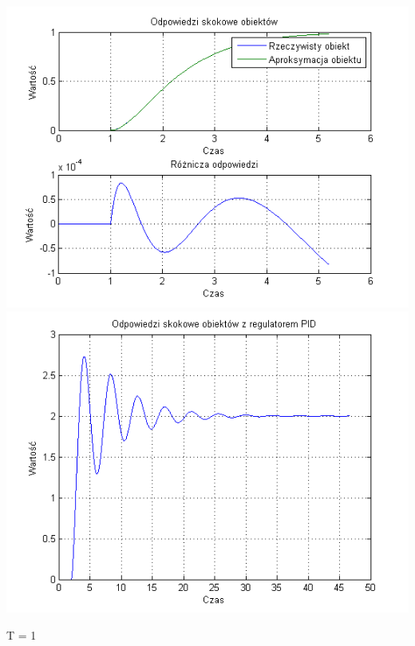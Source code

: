 \documentclass[10pt,a4paper]{article}
\begin{document}
\begin{center}
\includegraphics[scale=1]{images/dwa/skrypt_57.png}\\
\includegraphics[scale=1]{images/dwa/skrypt_58.png}\\
\end{center}
\newpage
T = 1
\end{document}
